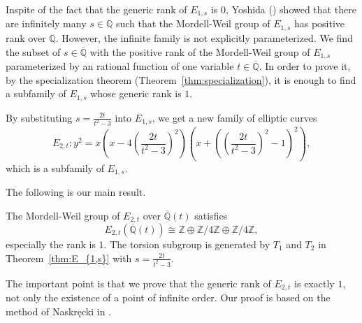 \documentclass[main]{subfiles}
\begin{document}
Inspite of the fact that the generic rank of $E_{1,s}$ is $0$, Yoshida (\cite[Corollary 4.7.]{ref:yoshida}) showed that there are infinitely many $s \in \mathbb{Q}$ such that the Mordell-Weil group of $E_{1,s}$ has positive rank over $\mathbb{Q}$.
However, the infinite family is not explicitly parameterized.
We find the subset of $s \in \overline{{\mathbb{Q}}}$ with the positive rank of the Mordell-Weil group of $E_{1,s}$ parameterized by an rational function of one variable $t \in \overline{\mathbb{Q}}$.
In order to prove it, by the specialization theorem (Theorem~\ref{thm:specialization}), it is enough to find a subfamily of $E_{1,s}$ whose generic rank is $1$.

By substituting $s = \frac{2t}{t^{2} - 3}$ into $E_{1,s}$, we get a new family of elliptic curves
\begin{equation*}
    E_{2,t}: y^{2} = x \left(x - 4 \left(\frac{2t}{t^{2} - 3} \right)^{2} \right) \left(x + \left(\left(\frac{2t}{t^{2} - 3} \right)^{2} - 1 \right)^{2} \right),
\end{equation*}
which is a subfamily of $E_{1,s}$.

The following is our main result.
\begin{thm}
    \label{thm:E_{2,t}}
    The Mordell-Weil group of $E_{2,t}$ over $\overline{\mathbb{Q}}(t)$ satisfies
    \begin{equation*}
        E_{2,t}(\overline{\mathbb{Q}}(t)) \cong \mathbb{Z} \oplus \mathbb{Z} / 4 \mathbb{Z} \oplus \mathbb{Z} / 4 \mathbb{Z},
    \end{equation*}
    especially the rank is $1$.
    The torsion subgroup is generated by $T_1$ and $T_2$ in Theorem~\ref{thm:E_{1,s}} with $s = \frac{2t}{t^{2} - 3}$.
\end{thm}
The important point is that we prove that the generic rank of $E_{2,t}$ is exactly $1$, not only the existence of a point of infinite order.
Our proof is based on the method of Naskręcki in \cite{ref:naskrecki2013}.
\end{document}
